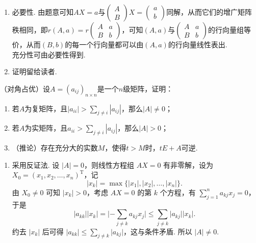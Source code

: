 \begin{exercise}
\begin{exgroup}
\begin{answer}
\begin{enumerate}
                \item 必要性. 由题意可知$AX=a$与$\begin{pmatrix} A \\ B \end{pmatrix}X=\begin{pmatrix} a \\ b \end{pmatrix}$同解，从而它们的增广矩阵秩相同，即$r(A,a)=r\begin{pmatrix}
                              A & a \\
                              B & b
                          \end{pmatrix}$，可知$(A,a)$与$\begin{pmatrix}
                              A & a \\
                              B & b
                          \end{pmatrix}$的行向量组等价，从而$(B,b)$的每一个行向量都可以由$(A,a)$的行向量线性表出.\\
                      充分性可由必要性得到.

                \item 证明留给读者.
            \end{enumerate}
        \end{answer}

        \item （对角占优）设$A=(a_{ij})_{n \times n}$是一个$n$级矩阵，证明：
        \begin{enumerate}
            \item 若$A$为复矩阵，且$|a_{ii}|>\displaystyle\sum_{j \neq i}|a_{ij}|$，那么$|A|\neq 0$；

            \item 若$A$为实矩阵，且$a_{ii}>\displaystyle\sum_{j \neq i}|a_{ij}|$，那么$|A|>0$；

            \item （推论）存在充分大的实数$M$，使得$t>M$时，$tE+A$可逆.
        \end{enumerate}
        \begin{answer}
            \begin{enumerate}
                \item \label{item:15:B:5:1}
                      采用反证法. 设 $\lvert A \rvert = 0$，则线性方程组 $AX = 0$ 有非零解，设为 $X_0 = (x_1, x_2, \ldots, x_n)^{\mathrm{T}}$，记
                      \[\lvert x_k \rvert = \max \{\lvert x_1 \rvert, \lvert x_2 \rvert, \ldots, \lvert x_n \rvert\}.\]
                      由 $X_0 \neq 0$ 可知 $\lvert x_k \rvert > 0$，考虑 $AX = 0$ 的第 $k$ 个方程，有 $\displaystyle\sum_{j=1}^n a_{kj}x_j = 0$，于是
                      \[\lvert a_{kk} \rvert \lvert x_k \rvert = \lvert -\displaystyle\sum_{j \neq k}a_{kj}x_j \rvert \leqslant \sum_{j \neq k}\lvert a_{kj} \rvert \lvert x_k \rvert.\]
                      约去 $\lvert x_k \rvert$ 后可得 $\lvert a_{kk} \rvert \leqslant \displaystyle\sum_{j \neq k} \lvert a_{kj} \rvert$，这与条件矛盾. 所以 $\lvert A \rvert \neq 0$.


\end{enumerate}
\end{answer}
\end{exgroup}
\end{exercise}
